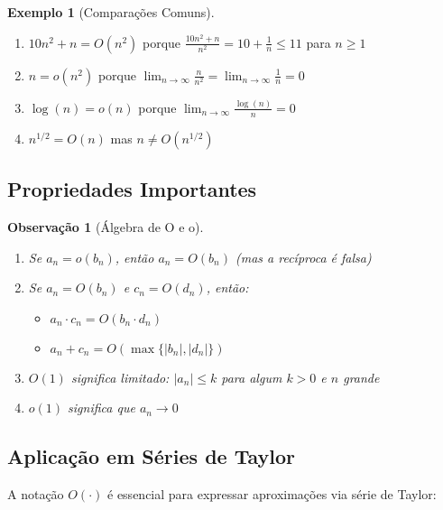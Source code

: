 \documentclass[12pt,a4paper]{article}
\theoremstyle{definition}
\newtheorem{exemplo}{Exemplo}[section]
\theoremstyle{plain}
\newtheorem{observacao}{Observação}[section]
\begin{document}
\begin{exemplo}[Comparações Comuns]
\begin{enumerate}
    \item $10n^2 + n = O(n^2)$ porque $\frac{10n^2 + n}{n^2} = 10 + \frac{1}{n} \leq 11$ para $n \geq 1$
    
    \item $n = o(n^2)$ porque $\lim_{n \to \infty} \frac{n}{n^2} = \lim_{n \to \infty} \frac{1}{n} = 0$
    
    \item $\log(n) = o(n)$ porque $\lim_{n \to \infty} \frac{\log(n)}{n} = 0$
    
    \item $n^{1/2} = O(n)$ mas $n \neq O(n^{1/2})$
\end{enumerate}
\end{exemplo}

\subsection{Propriedades Importantes}

\begin{observacao}[Álgebra de O e o]
\begin{enumerate}
    \item Se $a_n = o(b_n)$, então $a_n = O(b_n)$ (mas a recíproca é falsa)
    
    \item Se $a_n = O(b_n)$ e $c_n = O(d_n)$, então:
    \begin{itemize}
        \item $a_n \cdot c_n = O(b_n \cdot d_n)$
        \item $a_n + c_n = O(\max\{|b_n|, |d_n|\})$
    \end{itemize}
    
    \item $O(1)$ significa limitado: $|a_n| \leq k$ para algum $k > 0$ e $n$ grande
    
    \item $o(1)$ significa que $a_n \to 0$
\end{enumerate}
\end{observacao}

\subsection{Aplicação em Séries de Taylor}

A notação $O(\cdot)$ é essencial para expressar aproximações via série de Taylor:
\end{document}
